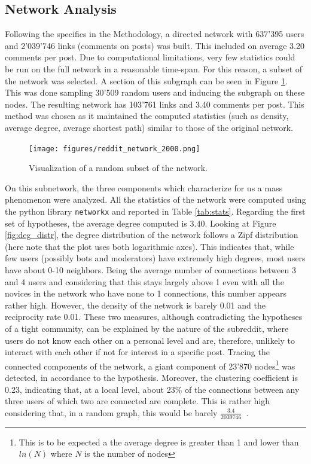 \documentclass[noacm,sigconf,authorversion]{acmart}
\begin{document}
\subsection{Network Analysis}
Following the specifics in the Methodology, a directed network with 637'395 users and 2'039'746 links (comments on posts) was built. This included on average 3.20 comments per post. Due to computational limitations, very few statistics could be run on the full network in a reasonable time-span. For this reason, a subset of the network was selected. A section of this subgraph can be seen in Figure \ref{fig:net}. This was done sampling 30'509 random users and inducing the subgraph on these nodes. The resulting network has 103'761 links and 3.40 comments per post. This method was chosen as it maintained the computed statistics (such as density, average degree, average shortest path) similar to those of the original network. 

\begin{figure}[h!]
    \centering
    \texttt{[image: figures/reddit\_network\_2000.png]}
    \caption{Visualization of a random subset of the network.}
    \label{fig:net}
\end{figure}
On this subnetwork, the three components which characterize for us a mass phenomenon were analyzed. All the statistics of the network were computed using the python library \texttt{networkx} and reported in Table \ref{tab:stats}. Regarding the first set of hypotheses, the average degree computed is 3.40. Looking at Figure \ref{fig:deg_distr}, the degree distribution of the network follows a Zipf distribution (here note that the plot uses both logarithmic axes). This indicates that, while few users (possibly bots and moderators) have extremely high degrees, most users have about 0-10 neighbors. Being the average number of connections between 3 and 4 users and considering that this stays largely above 1 even with all the novices in the network who have none to 1 connections, this number appears rather high. However, the density of the network is barely 0.01 and the reciprocity rate 0.01. These two measures, although contradicting the hypotheses of a tight community, can be explained by the nature of the subreddit, where users do not know each other on a personal level and are, therefore, unlikely to interact with each other if not for interest in a specific post. Tracing the connected components of the network, a giant component of 23'870 nodes\footnote{This is to be expected a the average degree is greater than 1 and lower than $ln(N)$ where $N$ is the number of nodes} was detected, in accordance to the hypothesis. Moreover, the clustering coefficient is 0.23, indicating that, at a local level, about 23\% of the connections between any three users of which two are connected are complete. This is rather high considering that, in a random graph, this would be barely $\frac{3.4}{2039746}$~\cite{knoke2019social}.  
\end{document}
